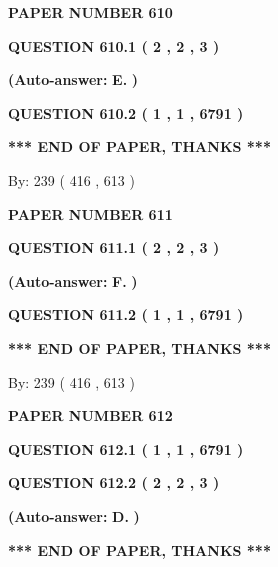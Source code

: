 \documentclass[12pt]{article}
\begin{document}
   
 {\textbf{ \Large{ PAPER NUMBER  610  }}}
   
   
   
   
  
  
{\textbf{\large{QUESTION
610.1 
 ( 2 , 2 , 3 )
}}}
 
 
{\textbf{(Auto-answer:}}
{\textbf{\large{
E.}}}
{\textbf{)}}
 
 
  
  
{\textbf{\large{QUESTION
610.2 
 ( 1 , 1 , 6791 )
}}}
   
   
   
   
\vspace{1.0in} 
{\textbf{\large{ *** END OF PAPER, THANKS *** }}} 
   
   
\hspace{1.0in} By: 
 239 ( 416 ,  613 )
   
   
   
   
\newpage 
\setcounter{page}{ 
   611001 } 
   
   
 {\textbf{ \Large{ PAPER NUMBER  611  }}}
   
   
   
   
  
  
{\textbf{\large{QUESTION
611.1 
 ( 2 , 2 , 3 )
}}}
 
 
{\textbf{(Auto-answer:}}
{\textbf{\large{
F.}}}
{\textbf{)}}
 
 
  
  
{\textbf{\large{QUESTION
611.2 
 ( 1 , 1 , 6791 )
}}}
   
   
   
   
\vspace{1.0in} 
{\textbf{\large{ *** END OF PAPER, THANKS *** }}} 
   
   
\hspace{1.0in} By: 
 239 ( 416 ,  613 )
   
   
   
   
\newpage 
\setcounter{page}{ 
   612001 } 
   
   
 {\textbf{ \Large{ PAPER NUMBER  612  }}}
   
   
   
   
  
  
{\textbf{\large{QUESTION
612.1 
 ( 1 , 1 , 6791 )
}}}
  
  
{\textbf{\large{QUESTION
612.2 
 ( 2 , 2 , 3 )
}}}
 
 
{\textbf{(Auto-answer:}}
{\textbf{\large{
D.}}}
{\textbf{)}}
 
 
   
   
   
   
\vspace{1.0in} 
{\textbf{\large{ *** END OF PAPER, THANKS *** }}} 
   
\end{document}
